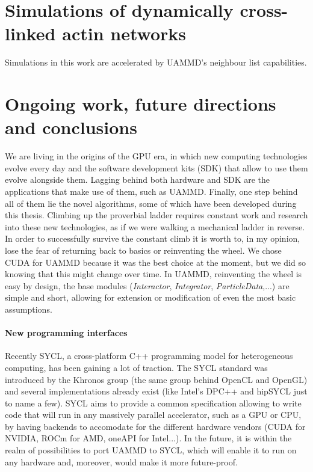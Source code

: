 \documentclass[ twoside,openright,titlepage,numbers=noenddot,%
headinclude,footinclude,cleardoublepage=empty,abstract=on,
BCOR=5mm,paper=a4,fontsize=11pt, dvipsnames
]{scrreprt}
\newcommand{\uammd}{\gls{UAMMD}\xspace}
\begin{document}
\chapter{Simulations of dynamically cross-linked actin networks}
Simulations in this work are accelerated by \uammd's neighbour list capabilities.

\chapter{Ongoing work, future directions and conclusions}\label{ch:ongoing}
We are living in the origins of the GPU era, in which new computing technologies evolve every day and the software development kits (SDK) that allow to use them evolve alongside them. Lagging behind both hardware and SDK are the applications that make use of them, such as UAMMD. Finally, one step behind all of them lie the novel algorithms, some of which have been developed during this thesis. Climbing up the proverbial ladder requires constant work and research into these new technologies, as if we were walking a mechanical ladder in reverse. In order to successfully survive the constant climb it is worth to, in my opinion, lose the fear of returning back to basics or reinventing the wheel. We chose CUDA for UAMMD because it was the best choice at the moment, but we did so knowing that this might change over time. In UAMMD, reinventing the wheel is easy by design, the base modules (\emph{Interactor}, \emph{Integrator}, \emph{ParticleData},...) are simple and short, allowing for extension or modification of even the most basic assumptions. 

\subsubsection*{New programming interfaces}
Recently SYCL, a cross-platform C++ programming model for heterogeneous computing, has been gaining a lot of traction. The SYCL standard was introduced by the Khronos group (the same group behind OpenCL and OpenGL) and several implementations already exist (like Intel's DPC++ and hipSYCL just to name a few). SYCL aims to provide a common specification allowing to write code that will run in any massively parallel accelerator, such as a GPU or CPU, by having backends to accomodate for the different hardware vendors (CUDA for NVIDIA, ROCm for AMD, oneAPI for Intel...). In the future, it is within the realm of possibilities to port UAMMD to SYCL, which will enable it to run on any hardware and, moreover, would make it more future-proof.
\end{document}

